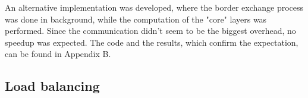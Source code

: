\documentclass{article}
\begin{document}
%
%
%
%

An alternative implementation was developed, where the border exchange process
was done in background, while the computation of the "core" layers was performed.
Since the communication didn't seem to be the biggest overhead, no speedup
was expected. The code and the results, which confirm the expectation, can be found
in Appendix B.

\subsection{Load balancing}
\end{document}
